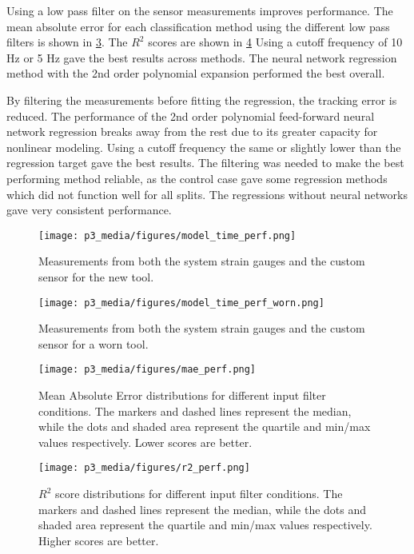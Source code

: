 Using a low pass filter on the sensor measurements improves performance. 
The mean absolute error for each classification method using the different low pass filters is shown in 
\ref{fig:MAE}. The $R^2$ scores are shown in \ref{fig:adjr2}
Using a cutoff frequency of 10 Hz or 5 Hz gave the best results across methods.
The neural network regression method with the 2nd order polynomial expansion performed the best overall.

By filtering the measurements before fitting the regression, 
the tracking error is reduced.
The performance of the 2nd order polynomial feed-forward neural network
regression breaks away from the rest due to its greater capacity for nonlinear modeling.
Using a cutoff frequency the same or slightly lower than the regression target gave 
the best results.
The filtering was needed to make the best performing method reliable, as the control case
gave some regression methods which did not function well for all splits.
The regressions without neural networks gave very consistent performance.

\begin{figure}[]
\centering
\texttt{[image: p3\_media/figures/model\_time\_perf.png]}
\caption{
Measurements from both the system strain gauges and the custom sensor for the new tool. 
}
\label{fig:sensor_rock_cut}
\end{figure}

\begin{figure}[]
\centering
\texttt{[image: p3\_media/figures/model\_time\_perf\_worn.png]}
\caption{
Measurements from both the system strain gauges and the custom sensor for a worn tool. 
}
\label{fig:sensor_rock_cut_worn}
\end{figure}

\begin{figure}[]
\centering
\texttt{[image: p3\_media/figures/mae\_perf.png]}
\caption{
Mean Absolute Error distributions for different input filter conditions.
The markers and dashed lines represent the median, while the dots and shaded area represent
the quartile and min/max values respectively. Lower scores are better.
}
\label{fig:MAE}
\end{figure}

\begin{figure}[]
\centering
\texttt{[image: p3\_media/figures/r2\_perf.png]}
\caption{
$R^2$ score distributions for different input filter conditions.
The markers and dashed lines represent the median, while the dots and shaded area represent
the quartile and min/max values respectively. Higher scores are better.
} 
\label{fig:adjr2}
\end{figure}

